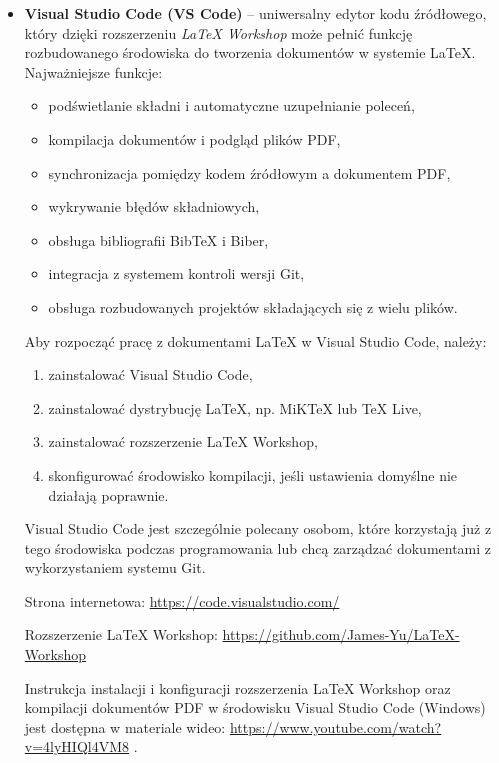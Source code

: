 \begin{itemize}

    \item \textbf{Visual Studio Code (VS Code)} -- uniwersalny edytor kodu źródłowego, który dzięki rozszerzeniu \textit{LaTeX Workshop} może pełnić funkcję rozbudowanego środowiska do tworzenia dokumentów w systemie \LaTeX{}. Najważniejsze funkcje:
    \begin{itemize}
        \item podświetlanie składni i automatyczne uzupełnianie poleceń,
        \item kompilacja dokumentów i podgląd plików PDF,
        \item synchronizacja pomiędzy kodem źródłowym a dokumentem PDF,
        \item wykrywanie błędów składniowych,
        \item obsługa bibliografii BibTeX i Biber,
        \item integracja z systemem kontroli wersji Git,
        \item obsługa rozbudowanych projektów składających się z wielu plików.
    \end{itemize}

    Aby rozpocząć pracę z dokumentami \LaTeX{} w Visual Studio Code, należy:
    \begin{enumerate}
        \item zainstalować Visual Studio Code,
        \item zainstalować dystrybucję \LaTeX{}, np. MiKTeX lub TeX Live,
        \item zainstalować rozszerzenie LaTeX Workshop,
        \item skonfigurować środowisko kompilacji, jeśli ustawienia domyślne nie działają poprawnie.
    \end{enumerate}

    Visual Studio Code jest szczególnie polecany osobom, które korzystają już z tego środowiska podczas programowania lub chcą zarządzać dokumentami z wykorzystaniem systemu Git.

    Strona internetowa: \url{https://code.visualstudio.com/}

    Rozszerzenie LaTeX Workshop: \url{https://github.com/James-Yu/LaTeX-Workshop}

    Instrukcja instalacji i konfiguracji rozszerzenia LaTeX Workshop oraz kompilacji dokumentów PDF w środowisku Visual Studio Code (Windows) jest dostępna w materiale wideo: \url{https://www.youtube.com/watch?v=4lyHIQl4VM8} \cite{LatexYT}.



\end{itemize}
